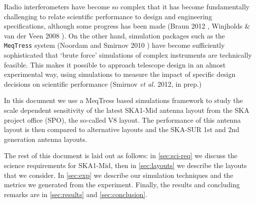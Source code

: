 \documentclass[sfheadings,a4paper,times,9pt,floats,floatfix]{article}
\begin{document}
Radio interferometers have become so complex that it has become fundamentally challenging to relate
scientific performance to design and engineering specifications, although some progress has been made (Braun
2012 \cite{rb}, Winjholds \& van der Veen 2008 \cite{wnj}). On the other hand, simulation packages such as the
\texttt{MeqTress} system (Noordam and Smirnov 2010 \cite{meqtrees}) have become sufficiently sophisticated that `brute
force' simulations of complex instruments are technically feasible. This makes it possible to approach telescope design
in an almost experimental way, using simulations to measure the impact of specific design decisions on scientific
performance (Smirnov {\it et al.} 2012, in prep.)

In this document we use a MeqTress based simulations framework to study the scale dependent sensitivity of the latest
SKA1-Mid antenna layout from the SKA project office (SPO), the so-called V8 layout. The performance of this
antenna layout is then compared to alternative layouts and the SKA-SUR 1st and 2nd generation antenna
layouts.

The rest of this document is laid out as follows: in \autoref{sec:sci-req} we discuss the science requirements for SKA1-Mid, then
in \autoref{sec:layouts} we describe the layouts that we consider. In \autoref{sec:exp} we describe our simulation
techniques and the metrics we generated from the experiment. Finally, the results and concluding remarks are in
\autoref{sec:results} and \autoref{sec:conclusion}.
\end{document}
